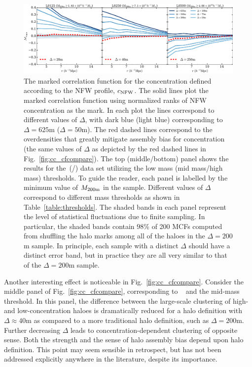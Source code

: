 \documentclass[usenatbib,fleqn]{mnras}
\begin{document}
\begin{figure}
	\centering
	\includegraphics[width=\textwidth]{all_mcf_cNFW.pdf}
	\caption{
The marked correlation function for the concentration defined according to the NFW profile, $c_{\rm NFW}$. The solid lines plot the marked correlation function using normalized ranks of NFW concentration as the mark. In each plot the lines correspond to different values of $\Delta$, with dark blue (light blue) corresponding to $\Delta = 625$m ($\Delta = 50$m). The red dashed lines correspond to the overdensities that greatly mitigate assembly bias for concentration (the same values of $\Delta$ as depicted by the red dashed lines in Fig.~\ref{fig:cc_cfcompare}). The top (middle/bottom) panel shows the results for the\simA \ (\simB /\simC) data set utilizing the low mass (mid mass/high mass) thresholds. To guide the reader, each panel is labelled by the minimum value of $M_{200{\rm m}}$ in the sample. Different values of $\Delta$ correspond to different mass thresholds as shown in Table~\ref{table:thresholds}. The shaded bands in each panel represent the level of statistical fluctuations due to finite sampling. In particular, the shaded bands contain $98\%$ of 200 MCFs computed from shuffling the halo marks among all of the haloes in the $\Delta=200$m sample. In principle, each sample with a distinct $\Delta$ should have a distinct error band, but in practice they are all very similar to that of the $\Delta=200$m sample.
}
\label{fig:cc_mcf_cnfw}
\end{figure}

Another interesting effect is noticeable in Fig.~\ref{fig:cc_cfcompare}. Consider the middle panel of Fig.~\ref{fig:cc_cfcompare}, corresponding to \simB~ and the mid-mass threshold. In this panel, the difference between the large-scale clustering of high- and low-concentration haloes is dramatically reduced for a halo definition with $\Delta \approx 40$m as compared to a more traditional halo definition, such as $\Delta=200$m. 
Further decreasing $\Delta$ leads to concentration-dependent clustering of opposite sense. Both the strength and the sense of halo assembly bias depend upon halo definition. This point may seem sensible in retrospect, but has not been addressed explicitly anywhere in the literature, despite its importance.
\end{document}
